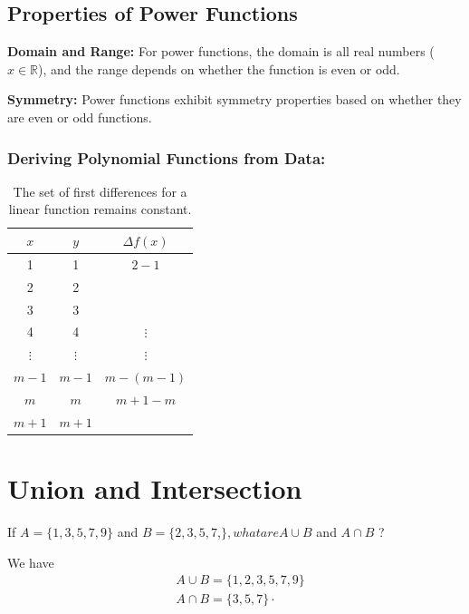 \documentclass{article}
\begin{document}
\subsection*{Properties of Power Functions}

\textbf{Domain and Range:} 
For power functions, the domain is all real numbers ($x \in \mathbb{R}$), and the range depends on whether the function is even or odd.

\textbf{Symmetry:} Power functions exhibit symmetry properties based on whether they are even or odd functions. 

\subsubsection{Deriving Polynomial Functions from Data:}

\begin{table}[h]
    \centering
    \begin{tabular}{|c|c|c|}
    \hline
        \rowcolor[HTML]{EFEFEF}
        $x$ & $y$ & $\Delta f(x)$ \\
        \hline
        1 & 1 & $2-1$\\
        \hline
        2 & 2 & \\
        \hline
        3 & 3 & \\
        \hline
        4 & 4 & $\vdots$ \\
        \hline
        $\vdots$ & $\vdots$ & $\vdots$\\
        \hline
        $m-1$ & $m-1$ & $m-(m-1)$\\
        \hline
        $m$ & $m$ & $m+1-m$\\
        \hline
        $m+1$ & $m+1$ & \\
        \hline
    \end{tabular}
    \caption*{The set of first differences for a linear function remains constant.}
\end{table}

\newpage
\section*{Union and Intersection}
If $A=\{1,3,5,7,9\}$ and $B=\{2,3,5,7$,$\} , what are A \cup B$ and $A \cap B$ ?

We have
$$
\begin{aligned}
& A \cup B=\{1,2,3,5,7,9\} \\
& A \cap B=\{3,5,7\} \cdot 
\end{aligned}
$$
\end{document}
